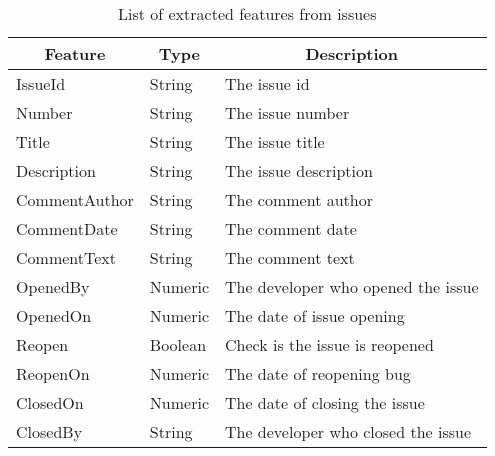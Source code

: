 \documentclass[sigconf,review]{acmart}
\begin{document}
\begin{table}
\caption{List of extracted features from issues} \label{tabel:issues}
\begin{tabular}{lll}
\hline
\hline
\multicolumn{1}{c}{Feature}
& \multicolumn{1}{c}{Type}
&	\multicolumn{1}{c}{Description}    \\    

\hline
   IssueId & String & The issue id \\     
    Number & String & The issue number \\
    Title & String &The issue title \\
    Description & String &The issue description \\

    CommentAuthor & String &The comment author \\
    CommentDate & String & The comment date \\
    CommentText & String &The comment text \\
    OpenedBy & Numeric & The developer who opened the issue \\
    OpenedOn & Numeric & The date of issue opening \\

    Reopen & Boolean & Check is the issue is reopened \\
    ReopenOn & Numeric & The date of reopening bug \\
    ClosedOn & Numeric & The date of closing the issue \\
    ClosedBy & String & The developer who closed the issue \\

\hline
\hline
\end{tabular}
\end{table}
\end{document}
